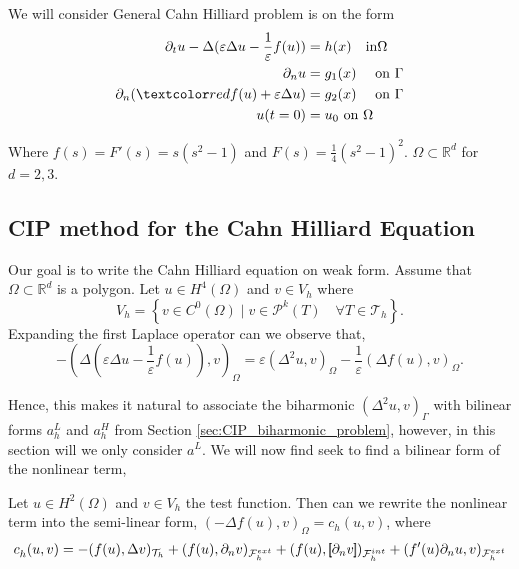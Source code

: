 We will consider General Cahn Hilliard problem is on the form
\begin{equation}
\label{eq:ch_exact}
    \begin{split}
        \partial _{t} u  - \Delta ( \varepsilon  \Delta u - \frac{1}{\varepsilon } f( u) ) & =  h(x)  \quad \text{in} \Omega \\
        \partial _{n} u & =  g_{1}(x)  \quad \text{ on } \Gamma \\
          \partial _{n} ( \red{ f( u) + \varepsilon } \Delta u ) & = g_{2}(x)  \quad \text{ on } \Gamma  \\
        u(t=0) & = u_{0}   \text{ on } \Omega
    \end{split}
\end{equation}

Where $f( s)  = F' ( s)=s( s^2 -1)  $ and $F( s)  = \frac{1}{4} ( s^2 - 1)^2 $. $\Omega \subset \mathbb{R} ^{d} $  for $d = 2,3$.



\subsection{ CIP method for the Cahn Hilliard Equation}%
\label{sub:writing_the_cahn_hilliard_equation_of_weak_form}

Our goal is to write the Cahn Hilliard equation on weak form.
Assume that $\Omega  \subset \mathbb{R} ^{d}$ is a polygon.
 Let $u \in  H^{4}( \Omega ) $ and $v \in V_{h} $ where
\[
V_{h} = \left\{ v \in C^{0}( \Omega )   \mid v\in \mathcal{P} ^{k} ( T) \quad \forall T \in \mathcal{T} _{h} \right\}.
\]
Expanding the first Laplace operator can we observe that,
\[
- ( \Delta ( \varepsilon  \Delta u - \frac{1}{\varepsilon } f( u) ) ,v )_{\Omega } = \varepsilon ( \Delta^{2} u ,v )_{\Omega } - \frac{1}{\varepsilon } ( \Delta f( u)  ,v )_{\Omega }.
\]

Hence, this makes it natural to associate the biharmonic $( \Delta ^2 u,v)_{\Gamma } $ with bilinear forms $a_h^{L} $ and $a^{H}_{h} $ from Section \ref{sec:CIP_biharmonic_problem}, however, in this section will we only consider $a^{L}$.
We will now find seek to find a bilinear form of the nonlinear term,

\begin{lemma}
    Let $u \in H^2( \Omega ) $ and $v \in V_{h}$ the test function.
Then can we rewrite the nonlinear term into the semi-linear form, $( -\Delta f( u) , v)_{\Omega } = c_{h}(u,v )   $, where
\[
    c^{}_{h} ( u,v)  = -( f( u), \Delta v )_{\mathcal{T} _{h}} + ( f(u), \partial _{n} v)_{\mathcal{F}^{ext}_{h} } +  ( f( u) , \left[\!\!\left[  \partial _{n}v  \right]\!\!\right]  )_{\mathcal{F} _{h}^{int}} + ( f'( u)  \partial _{n}u   ,  v)_{\mathcal{F} _{h}^{ext}}
\]

\end{lemma}

